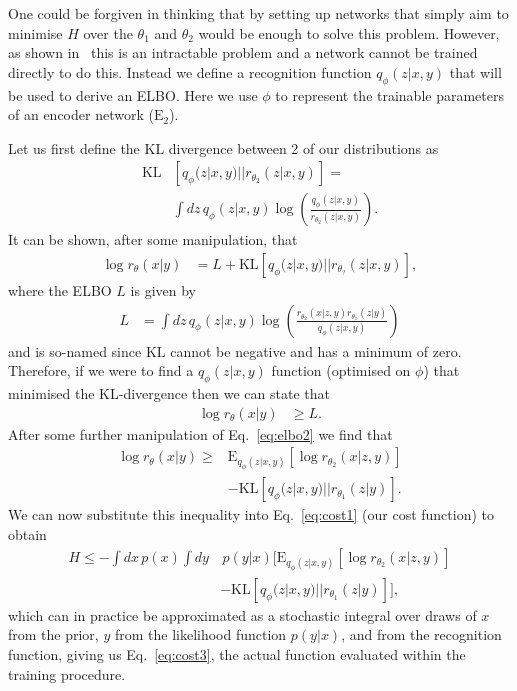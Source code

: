 \documentclass[%
showpacs,
 amsmath,amssymb,
 aps,
 twocolumn,
 prl,
 reprint,
floatfix,
]{revtex4-1}
\begin{document}
One could be forgiven in thinking that by setting up networks that simply aim
to minimise $H$ over the $\theta_{1}$ and $\theta_{2}$ would be enough to solve
this problem. However, as shown in~\cite{NIPS2015_5775} this is an intractable
problem and a network cannot be trained directly to do this. Instead we define
a recognition function $q_{\phi}(z|x,y)$ that will be used to derive an
\ac{ELBO}. Here we use $\phi$ to represent the trainable parameters of an
encoder network ($\text{E}_{2}$).

Let us first define the \ac{KL} divergence between 2 of our
distributions as
%
\begin{align}\label{eq:kl}
\text{KL}&\left[q_{\phi}(z|x,y)||r_{\theta_{2}}(z|x,y)\right] = \\
&\int dz\,q_{\phi}(z|x,y)
\log\left(\frac{q_{\phi}(z|x,y)}{r_{\theta_{2}}(z|x,y)}\right).\nonumber
\end{align}
%  
It can be shown, after some manipulation, that
%
\begin{align}\label{eq:elbo1}
\log r_{\theta}(x|y) &= L + \text{KL}\left[q_{\phi}(z|x,y)||r_{\theta_{?}}(z|x,y)\right],
\end{align}
%
where the \ac{ELBO} $L$ is given by
%
\begin{align}\label{eq:elbo2}
L &= \int dz\,
q_{\phi}(z|x,y)\log\left(\frac{r_{\theta_{2}}(x|z,y)r_{\theta_{1}}(z|y)}{q_{\phi}(z|x,y)}\right)
\end{align}
%
and is so-named since $\text{KL}$ cannot be negative and has a minimum of zero.
Therefore, if we were to find a $q_{\phi}(z|x,y)$ function (optimised on
$\phi$) that minimised the \ac{KL}-divergence then we can state that
%
\begin{align}
\log r_{\theta}(x|y) &\geq L.
\end{align}
%
After some further manipulation of Eq.~\ref{eq:elbo2} we find that
%
\begin{align}\label{eq:logr}
\log r_{\theta}(x|y) \geq  &\text{E}_{q_{\phi}(z|x,y)}\left[\log
r_{\theta_{2}}(x|z,y)\right] \nonumber\\
&-\text{KL}\left[q_{\phi}(z|x,y)||r_{\theta_{1}}(z|y)\right].
\end{align}
%
We can now substitute this inequality into Eq.~\ref{eq:cost1} (our cost
function) to obtain
%
\begin{align}\label{eq:cost2}
H \leq  -\int dx\, p(x)\int dy &\,p(y|x)
\Big[\text{E}_{q_{\phi}(z|x,y)}\left[\log r_{\theta_{2}}(x|z,y)\right]
\nonumber\\
&-\text{KL}\left[q_{\phi}(z|x,y)||r_{\theta_{1}}(z|y)\right]\Big],  
\end{align}
%
which can in practice be approximated as a stochastic integral over draws of
$x$ from the prior, $y$ from the likelihood function $p(y|x)$, and from the
recognition function, giving us Eq.~\ref{eq:cost3}, the actual function
evaluated within the training procedure.
\end{document}
